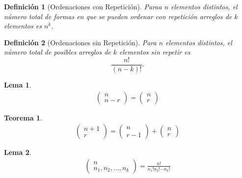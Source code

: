 \documentclass[12pt,twoside]{article}
\newtheorem{Def}{Definici\'on}
\newtheorem{Teo}{Teorema}
\newtheorem{lem}{Lema}
\begin{document}
\begin{Def}[Ordenaciones con Repetici\'on]
Paraa $n$ elementos distintos, el n\'umero total de formas en que se pueden ordenar con repetici\'on arreglos de $k$ elementos es $n^{k}$.

\end{Def}

\begin{Def}[Ordenaciones sin Repetici\'on]
Para $n$ elementos distintos, el n\'umero total de posibles arreglos de $k$ elementos sin repetir es $$\frac{n!}{\left(n-k\right)!}.$$

\end{Def}


\begin{lem}
\begin{eqnarray}
\left(\begin{array}{c}
n\\
n-r
\end{array}\right)=\left(\begin{array}{c}
n\\
r
\end{array}\right)
\end{eqnarray}

\end{lem}

\begin{Teo}
\begin{eqnarray}
\left(\begin{array}{c}
n+1\\
r
\end{array}\right)=\left(\begin{array}{c}
n\\
r-1
\end{array}\right)+\left(\begin{array}{c}
n\\
r
\end{array}\right)
\end{eqnarray}
\end{Teo}


\begin{lem}
\begin{eqnarray}
\left(\begin{array}{c}
n\\
n_{1},n_{2},\ldots,n_{k}
\end{array}\right)=\frac{n!}{n_{1}!n_{2}!\cdots n_{k}!}
\end{eqnarray}

\end{lem}
\end{document}
